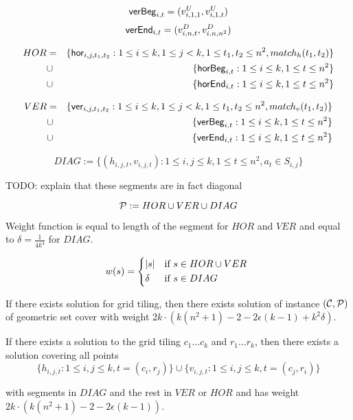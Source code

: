 $$\mathsf{verBeg}_{i,t} = (v^U_{i, 1, 1}, v^U_{i, 1, t})$$
$$\mathsf{verEnd}_{i,t} = (v^D_{i, n, t}, v^D_{i, n, n^2})$$

\begin{eqnarray*}
HOR &= &\{\mathsf{hor}_{i,j,t_1,t_2} : 1 \le i \le k, 1 \le j < k,
1 \le t_1, t_2 \le n^2, match_h(t_1, t_2)\} \\
&\cup &\{\mathsf{horBeg}_{i,t} : 1 \le i \le k, 1 \le t \le n^2\}
\\
&\cup &\{\mathsf{horEnd}_{i,t} : 1 \le i \le k, 1 \le t \le n^2\}
\end{eqnarray*}

\begin{eqnarray*}
VER &= &\{\mathsf{ver}_{i,j,t_1,t_2} : 1 \le i \le k, 1 \le j < k,
1 \le t_1, t_2 \le n^2, match_v(t_1, t_2)\} \\
&\cup &\{\mathsf{verBeg}_{i,t} : 1 \le i \le k, 1 \le t \le n^2\}
\\
&\cup &\{\mathsf{verEnd}_{i,t} : 1 \le i \le k, 1 \le t \le n^2\}
\end{eqnarray*}

$$DIAG := \{ (h_{i, j, t}, v_{i, j, t}) :
	1 \le i, j \le k, 1 \le t \le n^2, a_t \in S_{i, j}\}$$

TODO: explain that these segments are in fact diagonal

$$\mathcal{P} := HOR \cup VER \cup DIAG$$

Weight function is equal to length of the segment for $HOR$ and $VER$
and equal to $\delta = \frac{1}{4k^4}$ for $DIAG$.

\begin{equation}
w(s) =
	\begin{cases*}
	  |s| 			& if $s \in HOR \cup VER$ \\
	  \delta        & if $s \in DIAG$
	\end{cases*}
\end{equation}

\begin{lemma}
	If there exists solution for grid tiling,
	then there exists solution of instance $(\mathcal{C}, \mathcal{P})$
	of geometric set cover
	with weight $2k \cdot (k(n^2+1) - 2 - 2\epsilon(k-1) + k^2\delta)$.
\end{lemma}

\begin{claim}
	If there exists a solution to the grid tiling
	$c_1 \ldots c_k$ and $r_1 \ldots r_k$,
	then there exists a solution covering
	all points
	$$\{h_{i, j, t} : 1 \le i, j \le k, t=(c_i, r_j)\}
	\cup \{v_{i, j, t} : 1 \le i, j \le k, t=(c_j, r_i)\}$$
	
	with segments in $DIAG$
	and the rest in $VER$ or $HOR$
	and has weight $2k \cdot (k(n^2+1) - 2 - 2\epsilon(k-1))$.
\end{claim}

